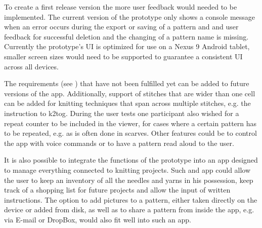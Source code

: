 To create a first release version the more user feedback would needed to be implemented. The current version of the prototype only shows a console message when an error occurs during the export or saving of a pattern and and user feedback for successful deletion and the changing of a pattern name is missing. Currently the prototype's \gls{UI} is optimized for use on a Nexus 9 Android tablet, smaller screen sizes would need to be supported to guarantee a consistent \gls{UI} across all devices. 

The requirements (see ) that have not been fulfilled yet can be added to future versions of the app. Additionally, support of stitches that are wider than one cell can be added for knitting techniques that span across multiple stitches, e.g. the instruction to \gls{k2tog}. During the user tests one participant also wished for a repeat counter to be included in the viewer, for cases where a certain pattern has to be repeated, e.g. as is often done in scarves. Other features could be to control the app with voice commands or to have a pattern read aloud to the user.  

It is also possible to integrate the functions of the prototype into an app designed to manage everything connected to knitting projects. Such and app could allow the user to keep an inventory of all the needles and yarns in his possession, keep track of a shopping list for future projects and allow the input of written instructions. The option to add pictures to a pattern, either taken directly on the device or added from disk, as well as to share a pattern from inside the app, e.g. via E-mail or DropBox, would also fit well into such an app. 
